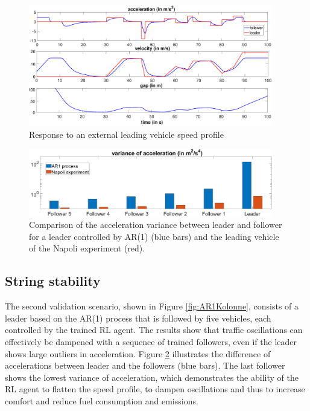 \documentclass[review]{elsarticle}
\providecommand{\3}{{\ss}}
\begin{document}
\begin{figure}
	\centering
	\includegraphics[width=0.95\textwidth]{images/manipulatedLeader.eps}
	\caption{Response to an external leading vehicle speed profile}
	\label{fig:manipulatedLeader}
\end{figure}

\begin{figure}
	\centering
	\includegraphics[width=0.95\textwidth]{images/VarAccComp}
	\caption{Comparison of the acceleration variance between
          leader and follower for a leader controlled by AR(1) (blue
          bars) and the leading vehicle of the Napoli experiment
          (red).}
	\label{fig:VarAccComp}
\end{figure}






\subsection{String stability}
\label{sec:stringStability}
The second validation scenario, shown in Figure
\ref{fig:AR1Kolonne}, consists of a leader based on the AR(1) process
that is
followed by five vehicles, each controlled by the trained RL
agent. The results show that traffic oscillations can effectively be
dampened with a sequence of trained followers, even if the leader
shows large outliers in acceleration. Figure \ref{fig:VarAccComp}
illustrates the difference of accelerations between leader and the
followers (blue bars). The last follower shows the lowest variance of
acceleration, which demonstrates the ability of the RL agent to
flatten the speed profile, to dampen oscillations and thus to increase
comfort and reduce fuel consumption and emissions.   
\end{document}
